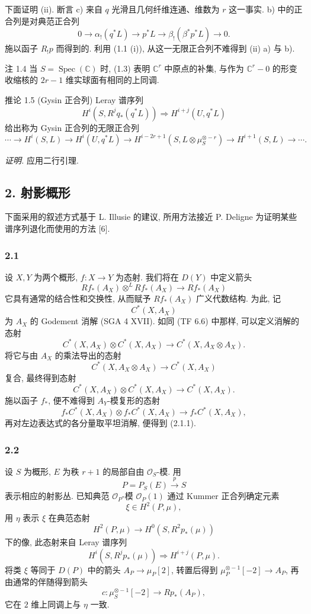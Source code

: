 下面证明 (ii). 断言 c) 来自 $q$ 光滑且几何纤维连通、维数为 $r$ 这一事实. b) 中的正合列是对典范正合列
\[
0\longrightarrow \alpha_!(q^*L)\longrightarrow p^*L\longrightarrow \beta_!(\beta^*p^*L)\longrightarrow 0.
\]
施以函子 $R_!p$ 而得到的. 利用 (1.1 (i)), 从这一无限正合列不难得到 (ii) a) 与 b).

\begin{statement}{注 1.4}
当 $S=\operatorname{Spec}(\mathbb C)$ 时, (1.3) 表明 $\mathbb C^r$ 中原点的补集, 与作为 $\mathbb C^r-0$ 的形变收缩核的 $2r-1$ 维实球面有相同的上同调.
\end{statement}

\begin{statement}{推论 1.5 (Gysin 正合列)}
Leray 谱序列
\[
H^i(S,R^j q_*(q^*L))\Rightarrow H^{i+j}(U,q^*L)
\]
给出称为 Gysin 正合列的无限正合列
\[
\cdots\longrightarrow H^i(S,L)\longrightarrow H^i(U,q^*L)\longrightarrow
H^{i-2r+1}(S,L\otimes\mu_S^{\otimes -r})\longrightarrow H^{i+1}(S,L)\longrightarrow\cdots.
\]
\end{statement}

\emph{证明.} 应用二行引理.

\subsection*{2. 射影概形}

下面采用的叙述方式基于 L. Illusie 的建议, 所用方法接近 P. Deligne 为证明某些谱序列退化而使用的方法 [6].

\subsubsection*{2.1}
设 $X,Y$ 为两个概形, $f:X\to Y$ 为态射. 我们将在 $D(Y)$ 中定义箭头
\[
Rf_*(A_X)\otimes^L Rf_*(A_X)\longrightarrow Rf_*(A_X)
\tag{2.1.1}
\]
它具有通常的结合性和交换性, 从而赋予 $Rf_*(A_X)$ 广义代数结构. 为此, 记
\[
C^*(X,A_X)
\]
为 $A_X$ 的 Godement 消解 (SGA 4 XVII). 如同 (TF 6.6) 中那样, 可以定义消解的态射
\[
C^*(X,A_X)\otimes C^*(X,A_X)\longrightarrow C^*(X,A_X\otimes A_X).
\]
将它与由 $A_X$ 的乘法导出的态射
\[
C^*(X,A_X\otimes A_X)\longrightarrow C^*(X,A_X)
\]
复合, 最终得到态射
\[
C^*(X,A_X)\otimes C^*(X,A_X)\longrightarrow C^*(X,A_X).
\tag{2.1.2}
\]
施以函子 $f_*$, 便不难得到 $A_Y$-模复形的态射
\[
f_*C^*(X,A_X)\otimes f_*C^*(X,A_X)\longrightarrow f_*C^*(X,A_X),
\]
再对左边表达式的各分量取平坦消解, 便得到 (2.1.1).

\subsubsection*{2.2}
设 $S$ 为概形, $E$ 为秩 $r+1$ 的局部自由 $\mathcal O_S$-模. 用
\[
P=P_S(E)\xrightarrow{p}S
\]
表示相应的射影丛. 已知典范 $\mathcal O_P$-模 $\mathcal O_P(1)$ 通过 Kummer 正合列确定元素
\[
\xi\in H^2(P,\mu),
\]
用 $\eta$ 表示 $\xi$ 在典范态射
\[
H^2(P,\mu)\longrightarrow H^0(S,R^2p_*(\mu))
\]
下的像, 此态射来自 Leray 谱序列
\[
H^i(S,R^jp_*(\mu))\Rightarrow H^{i+j}(P,\mu).
\]
将类 $\xi$ 等同于 $D(P)$ 中的箭头 $A_P\to\mu_P[2]$, 转置后得到 $\mu_P^{\otimes -1}[-2]\to A_P$, 再由通常的伴随得到箭头
\[
c:\mu_S^{\otimes -1}[-2]\longrightarrow Rp_*(A_P),
\]
它在 $2$ 维上同调上与 $\eta$ 一致.

